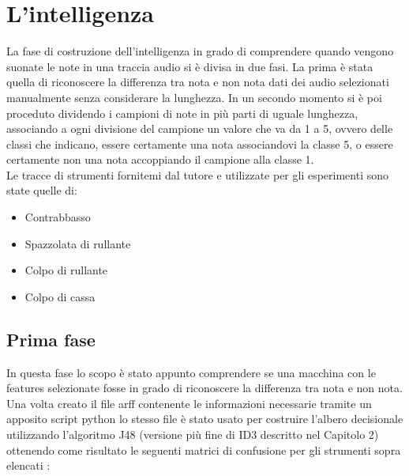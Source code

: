 \chapter{L'intelligenza}
La fase di costruzione dell'intelligenza in grado di comprendere quando vengono suonate le note in una traccia audio si è divisa in due fasi. La prima è stata quella di riconoscere la differenza tra nota e non nota dati dei audio selezionati manualmente senza considerare la lunghezza. In un secondo momento si è poi proceduto dividendo i campioni di note in più parti di uguale lunghezza, associando a ogni divisione del campione un valore che va da 1 a 5, ovvero delle classi che indicano, essere certamente una nota associandovi la classe 5, o essere certamente non una nota accoppiando il campione alla classe 1.\\
Le tracce di strumenti fornitemi dal tutore e utilizzate per gli esperimenti sono state quelle di: 
\begin{itemize}
	\item Contrabbasso
	\item Spazzolata di rullante
	\item Colpo di rullante
	\item Colpo di cassa
\end{itemize}


\section{Prima fase}
In questa fase lo scopo è stato appunto comprendere se una macchina con le features selezionate fosse in grado di riconoscere la differenza tra nota e non nota. Una volta creato il file arff contenente le informazioni necessarie tramite un apposito script python lo stesso file è stato usato per costruire l'albero decisionale utilizzando l'algoritmo J48 (versione più fine di ID3 descritto nel Capitolo 2) ottenendo come risultato le seguenti matrici di confusione per gli strumenti  sopra elencati :\\


\def\myConfMat{{
		{ 114,  10},  %
		{   7,  84},  %
}}

\def\classNames{{"SI","NO"}} %

\def\numClasses{2} %

